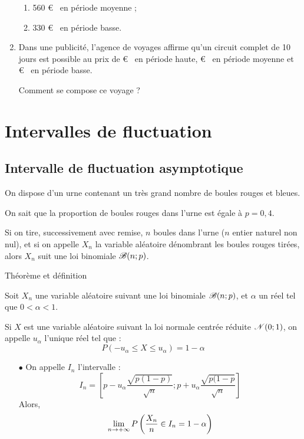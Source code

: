 \begin{spacing}{1.2}
\begin{enumerate}[\bf 1.]
\begin{enumerate}[\bf a.]
	\item 560 \euro~ en période moyenne ;
	
	\item 330 \euro~ en période basse.
	
	\end{enumerate}

\item Dans une publicité, l'agence de voyages affirme qu'un circuit complet de 10 jours est possible au prix de  \euro~ en période haute,  \euro~ en période moyenne et  \euro~ en période basse.

Comment se compose ce voyage ?

\end{enumerate}



\newpage
\section{Intervalles de fluctuation}

\subsection{Intervalle de fluctuation asymptotique}

On dispose d'un urne contenant un très grand nombre de boules rouges et bleues.

On sait que la proportion de boules rouges dans l'urne est égale à $p=0,4$.

Si on tire, successivement avec remise, $n$ boules dans l'urne ($n$ entier naturel non nul), et si on appelle $X_n$ la variable aléatoire dénombrant les boules rouges tirées, alors $X_n$ suit une loi binomiale $\mathscr{B}(n;p)$.

\medskip

\begin{bclogo}[couleur = gray!30 , arrondi = 0.1 ,logo = \bclampe , barre = snake , tailleOndu = 1.5]{Théorème et définition}

Soit $X_n$ une variable aléatoire suivant une loi binomiale $\mathscr{B}(n;p)$, et $\alpha$ un réel tel que $0<\alpha<1$.

Si $X$ est une variable aléatoire suivant la loi normale centrée réduite $\mathscr{N}(0;1)$, on appelle $u_{\alpha}$ l'unique réel tel que :
\[P(-u_{\alpha}\leq X\leq u_{\alpha})=1-\alpha\]
\begin{itemize}
\item[$\bullet$] On appelle $I_n$ l'intervalle :
\[I_n=\left[p-u_{\alpha}\frac{\sqrt{p(1-p)}}{\sqrt{n}};p+u_{\alpha}\frac{\sqrt{p(1-p}}{\sqrt{n}}\right]\]
Alors,
\[\limn P\left(\frac{X_n}{n}\in I_n=1-\alpha\right)\]


\end{itemize}
\end{bclogo}
\end{spacing}
